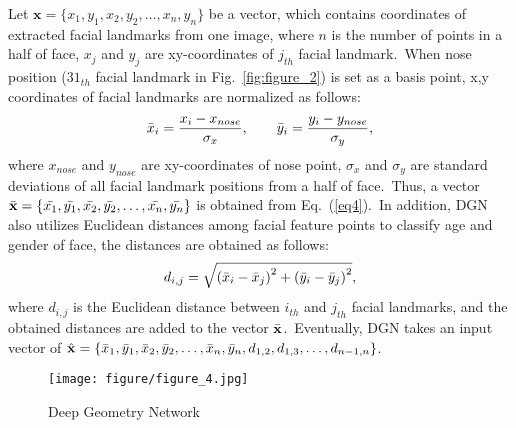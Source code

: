 \documentclass[10pt,twocolumn,letterpaper]{article}
\begin{document}
Let $\mathbf{x}=\{x_1,y_1,x_2,y_2,\ldots,x_n,y_n \}$ be a vector, which contains coordinates of extracted facial landmarks from one image, where $n$ is the number of points in a half of face, $x_j$ and $y_j$ are xy-coordinates of $j_{th}$ facial landmark.~When nose position ($31_{th}$ facial landmark in Fig.~\ref{fig:figure_2}) is set as a basis point, x,y coordinates of facial landmarks are normalized as follows:
\begin{equation}
\label{eq4}
    \Bar{x}_i=\frac{x_{i}-x_{nose}}{\sigma_x},\qquad\Bar{y}_i=\frac{y_{i}-y_{nose}}{\sigma_y},
\end{equation}
where $x_{nose}$ and $y_{nose}$ are xy-coordinates of nose point, $\sigma_x$ and $\sigma_y$ are standard deviations of all facial landmark positions from a half of face.~Thus, a vector $\Bar{\mathbf{x}}=\{\Bar{x_1},\Bar{y_1},\Bar{x_2},\Bar{y_2},\ldots,\Bar{x_n},\Bar{y_n} \}$ is obtained from Eq.~(\ref{eq4}).~In addition, DGN also utilizes Euclidean distances among facial feature points to classify age and gender of face, the distances are obtained as follows:
\begin{equation}
\label{eq5}
    d_{i,j}=\sqrt{\left(\Bar{x}_i-\Bar{x}_j\right)^2+\left(\Bar{y}_i-\Bar{y}_j\right)^2},
\end{equation}
where $d_{i,j}$ is the Euclidean distance between $i_{th}$ and $j_{th}$ facial landmarks, and the obtained distances are added to the vector $\Bar{\mathbf{x}}$.~Eventually, DGN takes an input vector of $\Hat{\mathbf{x}}=\{\Bar{x}_1,\Bar{y}_1,\Bar{x}_2,\Bar{y}_2,\ldots,\Bar{x}_n,\Bar{y}_n,d_{1,2},d_{1,3},\ldots,d_{n-1,n}\}$.
\begin{figure}[!h]
    \centering
    \texttt{[image: figure/figure\_4.jpg]}
    \caption{Deep Geometry Network}
    \label{fig:figure_4}
\end{figure}
\end{document}
